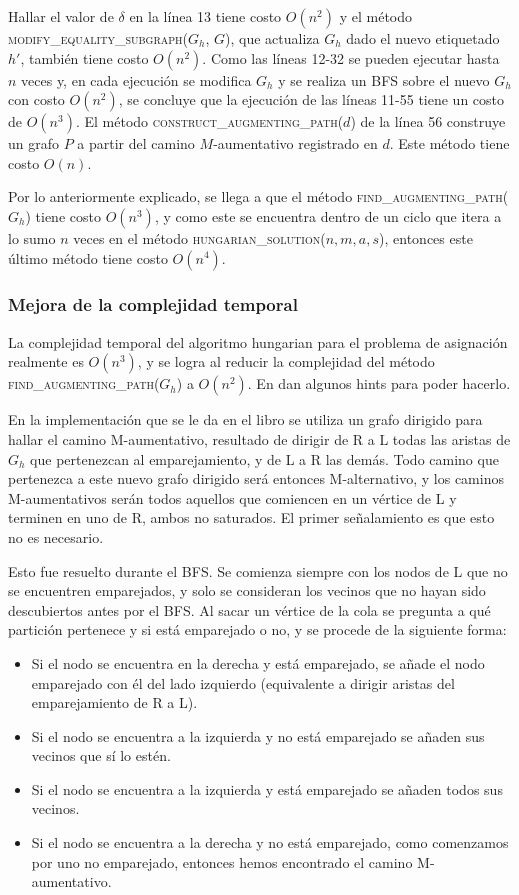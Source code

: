 \documentclass[10pt]{article} %
\begin{document}
	Hallar el valor de $\delta$ en la l\'inea 13 tiene costo $O(n^2)$ y el m\'etodo \textsc{modify\_equality\_subgraph($G_h$, $G$)}, que actualiza $G_h$ dado el nuevo etiquetado $h'$, tambi\'en tiene costo $O(n^2)$. 
	Como las l\'ineas 12-32 se pueden ejecutar hasta $n$ veces y, en cada ejecuci\'on se modifica $G_h$ y se realiza un BFS sobre el nuevo $G_h$ con costo $O(n^2)$, se concluye que la ejecuci\'on de las l\'ineas 11-55 tiene un costo de $O(n^3)$.
	El m\'etodo \textsc{construct\_augmenting\_path($d$)} de la l\'inea 56 construye un grafo $P$ a partir del camino $M$-aumentativo registrado en $d$. Este m\'etodo tiene costo $O(n)$. 
	
	Por lo anteriormente explicado, se llega a que el m\'etodo \textsc{find\_augmenting\_path($G_h$)} tiene costo $O(n^3)$, y como este se encuentra dentro de un ciclo que itera a lo sumo $n$ veces en el m\'etodo \textsc{hungarian\_solution($n,m,a,s$)}, entonces este \'ultimo m\'etodo tiene costo $O(n^4)$.
		
	\subsubsection{Mejora de la complejidad temporal}
	La complejidad temporal del algoritmo hungarian para el problema de asignaci\'on realmente es $ O(n^3) $, y se logra al reducir la complejidad del m\'etodo \textsc{find\_augmenting\_path($G_h$)} a $ O(n^2) $. En \cite{introduction} dan algunos hints para poder hacerlo. 
	
	En la implementaci\'on que se le da en el libro se utiliza un grafo dirigido para hallar el camino M-aumentativo, resultado de dirigir de R a L todas las aristas de $ G_h $ que pertenezcan al emparejamiento, y de L a R las dem\'as. Todo camino que pertenezca a este nuevo grafo dirigido ser\'a entonces M-alternativo, y los caminos M-aumentativos ser\'an todos aquellos que comiencen en un v\'ertice de L y terminen en uno de R, ambos no saturados. El primer se\~nalamiento es que esto no es necesario.
	
	Esto fue resuelto durante el BFS. Se comienza siempre con los nodos de L que no se encuentren emparejados, y solo se consideran los vecinos que no hayan sido descubiertos antes por el BFS. Al sacar un v\'ertice de la cola se pregunta a qu\'e partici\'on pertenece y si est\'a emparejado o no, y se procede de la siguiente forma:
	\begin{itemize}
		\item Si el nodo se encuentra en la derecha y est\'a emparejado, se a\~nade el nodo emparejado con \'el del lado izquierdo (equivalente a dirigir aristas del emparejamiento de R a L). 
		\item Si el nodo se encuentra a la izquierda y no est\'a emparejado se a\~naden sus vecinos que s\'i lo est\'en. 
		\item Si el nodo se encuentra a la izquierda y est\'a emparejado se a\~naden todos sus vecinos.
		\item Si el nodo se encuentra a la derecha y no est\'a emparejado, como comenzamos por uno no emparejado, entonces hemos encontrado el camino M-aumentativo.
	\end{itemize} 
	
\end{document}
